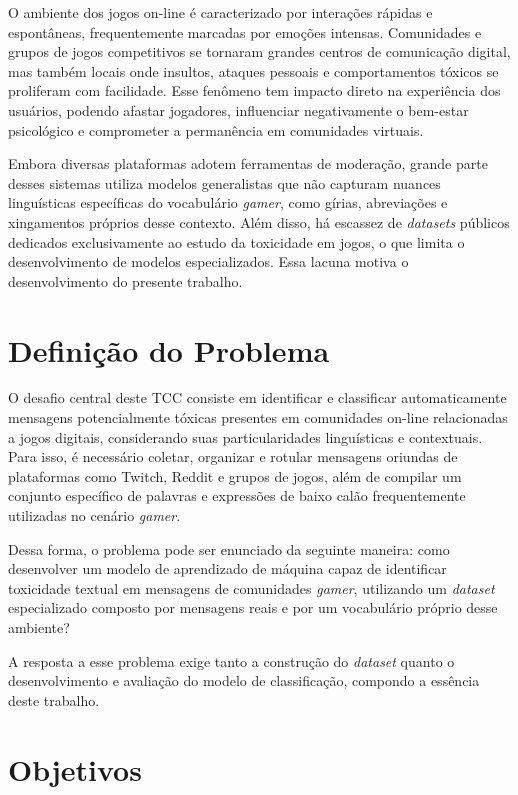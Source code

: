 \documentclass{eic-bcc-tcc}
\begin{document}
O ambiente dos jogos on-line é caracterizado por interações rápidas e espontâneas, frequentemente marcadas por emoções intensas. Comunidades e grupos de jogos competitivos se tornaram grandes centros de comunicação digital, mas também locais onde insultos, ataques pessoais e comportamentos tóxicos se proliferam com facilidade. Esse fenômeno tem impacto direto na experiência dos usuários, podendo afastar jogadores, influenciar negativamente o bem-estar psicológico e comprometer a permanência em comunidades virtuais.

Embora diversas plataformas adotem ferramentas de moderação, grande parte desses sistemas utiliza modelos generalistas que não capturam nuances linguísticas específicas do vocabulário \textit{gamer}, como gírias, abreviações e xingamentos próprios desse contexto. Além disso, há escassez de \textit{datasets} públicos dedicados exclusivamente ao estudo da toxicidade em jogos, o que limita o desenvolvimento de modelos especializados. Essa lacuna motiva o desenvolvimento do presente trabalho.

\section{Definição do Problema}

O desafio central deste TCC consiste em identificar e classificar automaticamente mensagens potencialmente tóxicas presentes em comunidades on-line relacionadas a jogos digitais, considerando suas particularidades linguísticas e contextuais. Para isso, é necessário coletar, organizar e rotular mensagens oriundas de plataformas como Twitch, Reddit e grupos de jogos, além de compilar um conjunto específico de palavras e expressões de baixo calão frequentemente utilizadas no cenário \textit{gamer}.

Dessa forma, o problema pode ser enunciado da seguinte maneira: como desenvolver um modelo de aprendizado de máquina capaz de identificar toxicidade textual em mensagens de comunidades \textit{gamer}, utilizando um \textit{dataset} especializado composto por mensagens reais e por um vocabulário próprio desse ambiente?

A resposta a esse problema exige tanto a construção do \textit{dataset} quanto o desenvolvimento e avaliação do modelo de classificação, compondo a essência deste trabalho.

\section{Objetivos}
\end{document}
